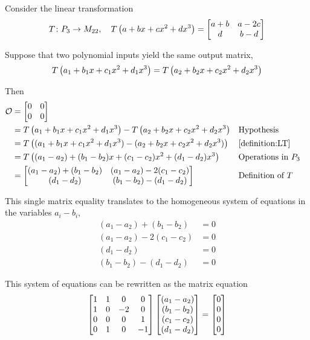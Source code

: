 \documentclass{ximera}
\begin{document}
\begin{example}

Consider the linear transformation
\[
T\colon P_3\rightarrow M_{22},\quad T\left(a+bx+cx^2+dx^3\right)=
\begin{bmatrix}
a+b & a-2c\\
d & b-d
\end{bmatrix}
\]

Suppose that two polynomial inputs yield the same output matrix,
\[
T\left(a_1+b_1x+c_1x^2+d_1x^3\right)=T\left(a_2+b_2x+c_2x^2+d_2x^3\right)
\]

Then
\begin{align*}
\mathcal{O}
&=\begin{bmatrix}
0&0\\0&0
\end{bmatrix}\\
&=T\left(a_1+b_1x+c_1x^2+d_1x^3\right)-T\left(a_2+b_2x+c_2x^2+d_2x^3\right)&&\text{Hypothesis}\\
&=T\left((a_1+b_1x+c_1x^2+d_1x^3)-(a_2+b_2x+c_2x^2+d_2x^3)\right)&&\ref{definition:LT}\\
&=T\left((a_1-a_2)+(b_1-b_2)x+(c_1-c_2)x^2+(d_1-d_2)x^3\right)&&\text{Operations in $P_3$}\\
&=
\begin{bmatrix}
(a_1-a_2)+(b_1-b_2) & (a_1-a_2)-2(c_1-c_2)\\
(d_1-d_2) & (b_1-b_2)-(d_1-d_2)
\end{bmatrix}&&\text{Definition of $T$}
\end{align*}



This single matrix equality translates to the homogeneous system of equations in the variables $a_i-b_i$,
\begin{align*}
(a_1-a_2)+(b_1-b_2)&=0\\
(a_1-a_2)-2(c_1-c_2)&=0\\
(d_1-d_2)&=0\\
(b_1-b_2)-(d_1-d_2)&=0
\end{align*}




This system of equations can be rewritten as the matrix equation
\[
\begin{bmatrix}
1&1&0&0\\1&0&-2&0\\0&0&0&1\\0&1&0&-1
\end{bmatrix}
\begin{bmatrix}(a_1-a_2)\\(b_1-b_2)\\(c_1-c_2)\\(d_1-d_2)\end{bmatrix}=\begin{bmatrix}0\\0\\0\\0\end{bmatrix}
\]





\end{example}
\end{document}

